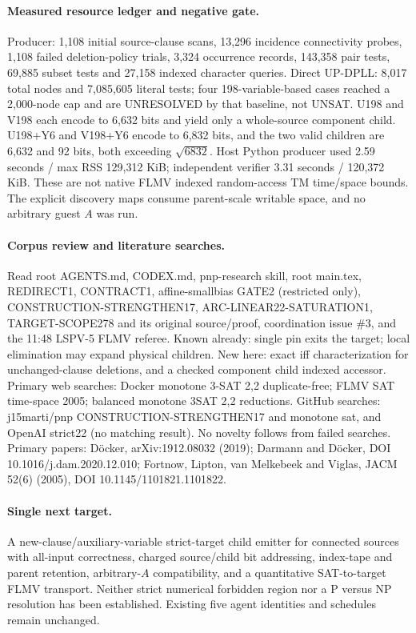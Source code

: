 \documentclass[11pt]{article}
\begin{document}
\paragraph{Measured resource ledger and negative gate.} Producer: 1,108 initial source-clause scans, 13,296 incidence connectivity probes, 1,108 failed deletion-policy trials, 3,324 occurrence records, 143,358 pair tests, 69,885 subset tests and 27,158 indexed character queries. Direct UP-DPLL: 8,017 total nodes and 7,085,605 literal tests; four 198-variable-based cases reached a 2,000-node cap and are UNRESOLVED by that baseline, not UNSAT. U198 and V198 each encode to 6,632 bits and yield only a whole-source component child. U198+Y6 and V198+Y6 encode to 6,832 bits, and the two valid children are 6,632 and 92 bits, both exceeding $\sqrt{6832}$. Host Python producer used 2.59 seconds / max RSS 129,312 KiB; independent verifier 3.31 seconds / 120,372 KiB. These are not native FLMV indexed random-access TM time/space bounds. The explicit discovery maps consume parent-scale writable space, and no arbitrary guest $A$ was run.
\paragraph{Corpus review and literature searches.} Read root AGENTS.md, CODEX.md, pnp-research skill, root main.tex, REDIRECT1, CONTRACT1, affine-smallbias GATE2 (restricted only), CONSTRUCTION-STRENGTHEN17, ARC-LINEAR22-SATURATION1, TARGET-SCOPE278 and its original source/proof, coordination issue \#3, and the 11:48 LSPV-5 FLMV referee. Known already: single pin exits the target; local elimination may expand physical children. New here: exact iff characterization for unchanged-clause deletions, and a checked component child indexed accessor. Primary web searches: Docker monotone 3-SAT 2,2 duplicate-free; FLMV SAT time-space 2005; balanced monotone 3SAT 2,2 reductions. GitHub searches: j15marti/pnp CONSTRUCTION-STRENGTHEN17 and monotone sat, and OpenAI strict22 (no matching result). No novelty follows from failed searches. Primary papers: D\"ocker, arXiv:1912.08032 (2019); Darmann and D\"ocker, DOI 10.1016/j.dam.2020.12.010; Fortnow, Lipton, van Melkebeek and Viglas, JACM 52(6) (2005), DOI 10.1145/1101821.1101822.
\paragraph{Single next target.} A new-clause/auxiliary-variable strict-target child emitter for connected sources with all-input correctness, charged source/child bit addressing, index-tape and parent retention, arbitrary-$A$ compatibility, and a quantitative SAT-to-target FLMV transport. Neither strict numerical forbidden region nor a P versus NP resolution has been established. Existing five agent identities and schedules remain unchanged.
\end{document}
